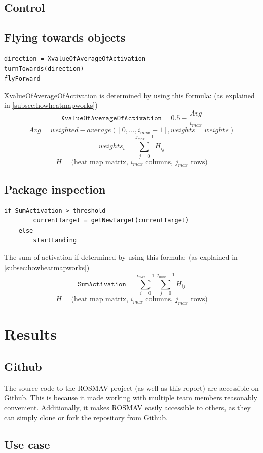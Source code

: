 \documentclass[a4paper,10pt]{article}
\begin{document}
\subsection{Control}

\subsection{Flying towards objects\label{flytowards}}
\begin{verbatim}
direction = XvalueOfAverageOfActivation
turnTowards(direction)
flyForward
\end{verbatim}
XvalueOfAverageOfActivation is determined by using this formula: (as explained in \ref{subsec:howheatmapworks})
\[\texttt{XvalueOfAverageOfActivation} = 0.5 - \frac{Avg}{i_{max}}\]
\[Avg = weighted-average([0, ..., i_{max} - 1], weights=weights)\]
\[weights_i = \sum_{j=0}^{j_{max}-1} H_{ij} \]
\[H = \textrm{(heat map matrix, $i_{max}$ columns, $j_{max}$ rows)}\]

\subsection{Package inspection\label{sec:packageinspection}}
\begin{verbatim}
if SumActivation > threshold
        currentTarget = getNewTarget(currentTarget)
    else
        startLanding
\end{verbatim}
The sum of activation if determined by using this formula: (as explained in \ref{subsec:howheatmapworks})
\[\texttt{SumActivation} = \sum_{i=0}^{i_{max}-1} \sum_{j=0}^{j_{max}-1} H_{ij}\]
\[H = \textrm{(heat map matrix, $i_{max}$ columns, $j_{max}$ rows)}\]

\section{Results}

\subsection{Github}
The source code to the ROSMAV project (as well as this report) are accessible
on Github. This is because it made working with multiple team members
reasonably convenient. Additionally, it makes ROSMAV easily accessible to
others, as they can simply clone or fork the repository from Github.
\subsection{Use case}
\end{document}
